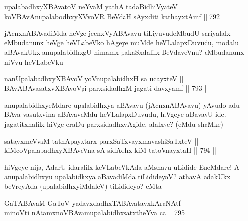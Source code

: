 
\begin{shl}
upalabadhxyXBAvatoV neYvaM yathA tadaBidhiVyateV || \\
koV\s BAvAnupalabodhxyXVvoVR BeVdaH sAyxditi kathayxtAmf ||  792 ||  
\end{shl}

\begin{artha}
jAcnxnABAvadiMda heVge jecnxVyABAvavu tiLiyuvudeMbudU sariyalalx eMbudanunx heVge heVLabeVko hAgeye muMde heVLalapxDuvudu, modalu aBAvakUkx anupalabidhxgU nimamx pakaSxdalilx BeVdaveVnu? eMbudanunx niVvu heVLabeVku
\end{artha}


\begin{shl}
nanUpalabadhxyXBAvoV yoV\s nupalabidhxH sa ucayxteV || \\
BAvABAvasatxvXBAvoV\s pi parxsidadhxM jagati davxyamf ||  793 ||  
\end{shl}

\begin{artha}
anupalabidhxyeMdare upalabidhxya aBAvavu (jAcnxnABAvavu) yAvudo adu BAva vasutxvina aBAvaveMdu heVLalapxDuvudu, hiVgeye aBavavU ide. jagatitxnalilx hiVge eraDu parxsidadhxvAgide, alalxve? (eMdu shaMke)
\end{artha}


\begin{shl}
satayxmeVvaM tathA\s payxtarx parxSaTxvayxmavashiSaTxteV || \\
kiMcoVpalabadhxyXBAveVna sA sidAdhx kiM tatoV\s nayxtaH ||  794 ||  
\end{shl}

\begin{artha}
hiVgeye nija, AdarU idaralilx keVLabeVkAda aMshavu uLidide EneMdare! A anupalabidhxyu upalabidhxya aBavadiMda tiLidideyoV? athavA adakUkx beVreyAda (upalabidhxyiMdaleV) tiLidideyo? eMta
\end{artha}


\begin{shl}
GaTABAvaM GaToV yadavxdadhxTABAvatavxkAraNAtf || \\
minoVti nA\s \s tamxnoV\s BAvamupalabidhxsatxtheYva ca ||  795 ||  
\end{shl}

